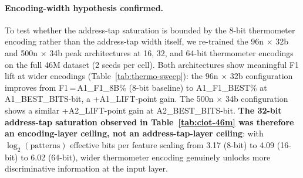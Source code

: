 

\paragraph{Encoding-width hypothesis confirmed.}
To test whether the address-tap saturation is bounded by the 8-bit
thermometer encoding rather than the address-tap width itself, we
re-trained the 96n $\times$ 32b and 500n $\times$ 34b peak architectures
at 16, 32, and 64-bit thermometer encodings on the full 46M dataset
(2 seeds per cell). Both architectures show meaningful F1 lift at
wider encodings (Table~\ref{tab:thermo-sweep}): the 96n $\times$ 32b
configuration improves from F1\,=\,A1\_F1\_8B\% (8-bit baseline) to
A1\_F1\_BEST\% at A1\_BEST\_BITS-bit, a +A1\_LIFT-point gain. The 500n
$\times$ 34b configuration shows a similar +A2\_LIFT-point gain at
A2\_BEST\_BITS-bit. \textbf{The 32-bit address-tap saturation observed
in Table~\ref{tab:ciot-46m} was therefore an encoding-layer ceiling,
not an address-tap-layer ceiling}: with $\log_2(\text{patterns})$
effective bits per feature scaling from 3.17 (8-bit) to 4.09 (16-bit)
to 6.02 (64-bit), wider thermometer encoding genuinely unlocks more
discriminative information at the input layer.


